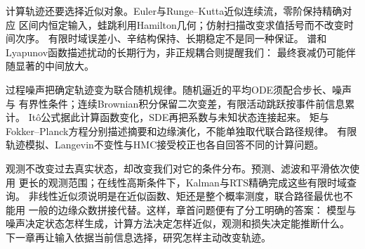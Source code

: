 计算轨迹还要选择近似对象。Euler与Runge--Kutta近似连续流，零阶保持精确对应
区间内恒定输入，蛙跳利用Hamilton几何；仿射扫描改变求值括号而不改变时间次序。
有限时域误差小、辛结构保持、长期稳定不是同一种保证。
谱和Lyapunov函数描述扰动的长期行为，非正规耦合则提醒我们：
最终衰减仍可能伴随显著的中间放大。

过程噪声把确定轨迹变为联合随机规律。随机逼近的平均ODE须配合步长、噪声与
有界性条件；连续Brownian积分保留二次变差，有限活动跳跃按事件前信息累计。
Itô公式据此计算函数变化，SDE再把系数与未知状态连接起来。
矩与Fokker--Planck方程分别描述摘要和边缘演化，不能单独取代联合路径规律。
有限轨迹模拟、Langevin不变性与HMC接受校正也各自回答不同的计算问题。

观测不改变过去真实状态，却改变我们对它的条件分布。预测、滤波和平滑依次使用
更长的观测范围；在线性高斯条件下，Kalman与RTS精确完成这些有限时域查询。
非线性近似须说明是在近似函数、矩还是整个概率测度，联合路径最优也不能用
一般的边缘众数拼接代替。这样，章首问题便有了分工明确的答案：
模型与噪声决定状态怎样生成，计算方法决定怎样近似，观测和损失决定能推断什么。
下一章再让输入依据当前信息选择，研究怎样主动改变轨迹。
